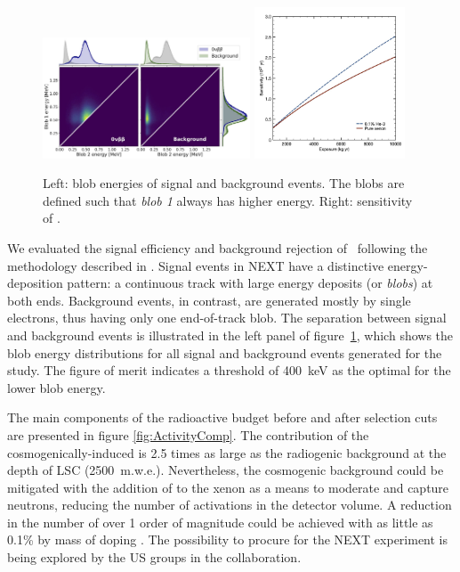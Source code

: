 \begin{figure}
\centering
\includegraphics[width=0.55\textwidth]{img2/BlobComparison.jpg}
\includegraphics[width=0.40\textwidth]{img2/sensitivity_nexthd_lsc.jpg}
\caption{Left: blob energies of signal and background events. The blobs are defined such that \emph{blob 1} always has higher energy. Right: sensitivity of \NHD.}
\label{fig:blobs}
\end{figure}

We evaluated the signal efficiency and background rejection of \NHD\ following the methodology described in \cite{Martin-Albo:2015rhw, NEXT:2020amj}. Signal events in NEXT have a distinctive energy-deposition pattern: a continuous track with large energy deposits (or \emph{blobs}) at both ends. Background events, in contrast, are generated mostly by single electrons, thus having only one end-of-track blob. The separation between signal and background events is illustrated in the left panel of figure~\ref{fig:blobs}, which shows the blob energy distributions for all signal and background events generated for the study. The figure of merit indicates a threshold of \SI{400}{\kilo\eV} as the optimal for the lower blob energy.

\indent

The main components of the radioactive budget before and after selection cuts are presented in figure \ref{fig:ActivityComp}. The contribution of the cosmogenically-induced  is 2.5 times as large as the radiogenic background at the depth of LSC (2500~m.w.e.). Nevertheless, the cosmogenic background could be mitigated with the addition of  to the xenon as a means to moderate and capture neutrons, reducing the number of activations in the detector volume. A reduction in the number  of over 1 order of magnitude could be achieved with as little as 0.1\% by mass of  doping \cite{rogers2020mitigation}. The possibility to procure  for the NEXT experiment is being explored by the US groups in the collaboration. 

